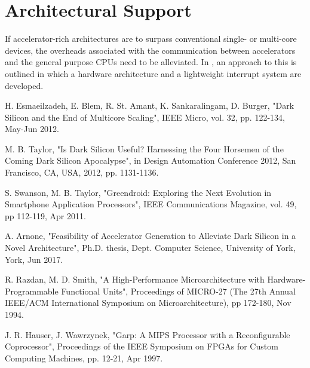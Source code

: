 \documentclass{UoYCSproject}
\begin{document}
\section{Architectural Support}

If accelerator-rich architectures are to surpass conventional single- or multi-core devices, the overheads associated with
the communication between accelerators and the general purpose CPUs need to be alleviated. In \cite{accelerator-rich-cmp},
an approach to this is outlined in which a hardware architecture and a lightweight interrupt system are developed.

\begin{thebibliography}{9}
H. Esmaeilzadeh, E. Blem, R. St. Amant, K. Sankaralingam, D. Burger, "Dark Silicon and the End of Multicore Scaling", IEEE Micro, vol. 32, pp. 122-134, May-Jun 2012.

M. B. Taylor, "Is Dark Silicon Useful? Harnessing the Four Horsemen of the Coming Dark Silicon Apocalypse", in Design Automation Conference 2012, San Francisco, CA, USA, 2012, pp. 1131-1136.

S. Swanson, M. B. Taylor, "Greendroid: Exploring the Next Evolution in Smartphone Application Processors", IEEE Communications Magazine, vol. 49, pp 112-119, Apr 2011.

A. Arnone, "Feasibility of Accelerator Generation to Alleviate Dark Silicon in a Novel Architecture", Ph.D. thesis, Dept. Computer Science, University of York, York, Jun 2017.

R. Razdan, M. D. Smith, "A High-Performance Microarchitecture with Hardware-Programmable Functional Units", Proceedings of MICRO-27 (The 27th Annual IEEE/ACM International Symposium on Microarchitecture), pp 172-180, Nov 1994.

J. R. Hauser, J. Wawrzynek, "Garp: A MIPS Processor with a Reconfigurable Coprocessor", Proceedings of the IEEE Symposium on FPGAs for Custom Computing Machines, pp. 12-21, Apr 1997.

\end{thebibliography}
\end{document}
